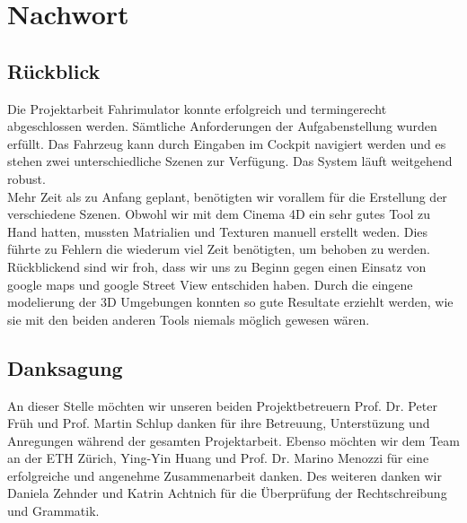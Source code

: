 \section{Nachwort}
\subsection{Rückblick}
Die Projektarbeit Fahrimulator konnte erfolgreich und termingerecht abgeschlossen werden. Sämtliche Anforderungen der Aufgabenstellung wurden erfüllt. Das Fahrzeug kann durch Eingaben im Cockpit navigiert werden und es stehen zwei unterschiedliche Szenen zur Verfügung. Das System läuft weitgehend robust.\\
Mehr Zeit als zu Anfang geplant, benötigten wir vorallem für die Erstellung der verschiedene Szenen. Obwohl wir mit dem Cinema 4D ein sehr gutes Tool zu Hand hatten, mussten Matrialien und Texturen manuell erstellt weden. Dies führte zu Fehlern die wiederum viel Zeit benötigten, um behoben zu werden.\\
Rückblickend sind wir froh, dass wir uns zu Beginn gegen einen Einsatz von google maps und google Street View entschiden haben. Durch die eingene modelierung der 3D Umgebungen konnten so gute Resultate erziehlt werden, wie sie mit den beiden anderen Tools niemals möglich gewesen wären. 
\subsection{Danksagung}
An dieser Stelle möchten wir unseren beiden Projektbetreuern  Prof. Dr. Peter Früh und Prof. Martin Schlup danken für ihre Betreuung, Unterstüzung und Anregungen während der gesamten Projektarbeit. Ebenso möchten wir dem Team an der ETH Zürich, Ying-Yin Huang und Prof. Dr. Marino Menozzi für eine erfolgreiche und angenehme Zusammenarbeit danken. Des weiteren danken wir Daniela Zehnder und Katrin Achtnich für die Überprüfung der Rechtschreibung und Grammatik. 
